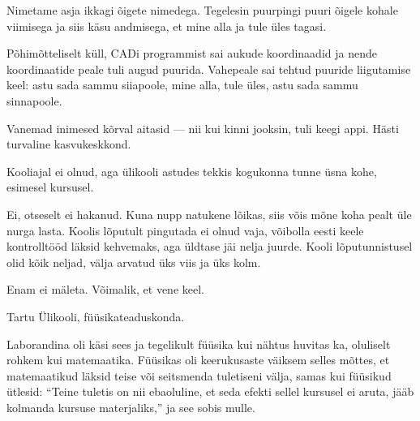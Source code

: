 
Nimetame asja ikkagi õigete nimedega. Tegelesin puurpingi puuri õigele kohale 
viimisega ja siis käsu andmisega, et mine alla ja tule üles tagasi.


Põhimõtteliselt küll, CADi programmist sai aukude koordinaadid 
ja nende koordinaatide peale tuli augud puurida. Vahepeale sai 
tehtud puuride liigutamise keel: astu sada sammu siiapoole, 
mine alla, tule üles, astu sada sammu sinnapoole.


Vanemad inimesed kõrval aitasid --- nii kui kinni jooksin, tuli 
keegi appi. Hästi turvaline kasvukeskkond.


Kooliajal ei olnud, aga ülikooli astudes tekkis kogukonna tunne 
üsna kohe, esimesel kursusel.


Ei, otseselt ei hakanud. Kuna nupp natukene lõikas, siis võis mõne koha pealt 
üle nurga lasta. Koolis lõputult pingutada ei olnud vaja, võibolla eesti 
keele kontrolltööd läksid kehvemaks, aga üldtase jäi nelja juurde. Kooli lõputunnistusel olid kõik neljad, välja 
arvatud üks viis ja üks kolm. 


Enam ei mäleta. Võimalik, et vene keel.


Tartu Ülikooli, füüsikateaduskonda.


Laborandina oli käsi sees ja tegelikult füüsika kui nähtus huvitas ka, 
oluliselt rohkem kui matemaatika. Füüsikas oli keerukusaste 
väiksem selles mõttes, et matemaatikud läksid teise või seitsmenda 
tuletiseni välja, samas kui füüsikud ütlesid: \enquote{Teine tuletis on nii 
ebaoluline, et seda efekti sellel kursusel ei aruta, jääb kolmanda kursuse 
materjaliks,} ja see sobis mulle.


